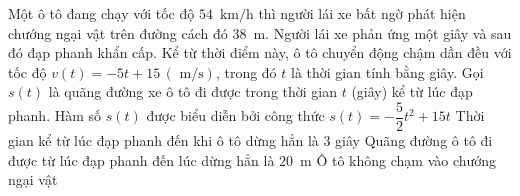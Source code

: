 \begin{ex}%
	Một ô tô đang chạy với tốc độ $54\,\text{ km/h}$ thì người lái xe bất ngờ phát hiện chướng ngại vật trên đường cách đó $38\,\text{ m}$. Người lái xe phản ứng một giây và sau đó đạp phanh khẩn cấp. Kể từ thời điểm này, ô tô chuyển động chậm dần đều với tốc độ $v\left( t \right) = -5t + 15\,\left( \text{ m/s} \right)$, trong đó $t$ là thời gian tính bằng giây. Gọi $s\left( t \right)$ là quãng đường xe ô tô đi được trong thời gian $t$ (giây) kể từ lúc  đạp phanh.
	 \choiceTF
		{\True Hàm số $s\left( t \right)$ được  biểu diễn bởi công thức $s\left(t \right) = -\dfrac{5}{2}t^2 + 15t$}
		{\True Thời gian kể từ lúc đạp  phanh đến khi ô tô dừng hẳn là $3$ giây}
		{Quãng đường ô tô đi được từ lúc đạp phanh đến lúc dừng hẳn là $20\,\text{ m}$} 
		{\True  Ô tô không chạm vào chướng ngại vật}
\end{ex}

